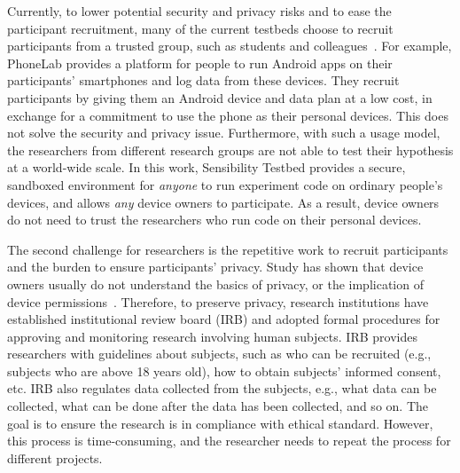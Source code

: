 Currently, to lower potential security and privacy risks and to ease the 
participant recruitment, many of the current testbeds choose to 
recruit participants from a trusted group, such as students and 
colleagues~\cite{hao2013isleep, wang2012no, 
wang2013sensing}. For example, PhoneLab provides a platform for 
people to run Android apps on their participants' smartphones 
and log data from these devices. They recruit participants by 
giving them an Android device and data plan at a low cost, in 
exchange for a commitment to use the phone as their personal 
devices. This does not solve the security and privacy issue. 
Furthermore, with such a usage model, the researchers from different research 
groups are not able to test their hypothesis at a world-wide scale.
In this work, Sensibility Testbed provides a secure, sandboxed 
environment for \textit{anyone} to run experiment code on ordinary 
people's devices, and allows \textit{any} device owners to participate. 
As a result, device owners do not need to trust the researchers 
who run code on their personal devices.

The second challenge for researchers is the repetitive work
to recruit participants and the burden to ensure participants' privacy. 
Study has shown that device owners usually do not understand the 
basics of privacy, or the implication of device 
permissions~\cite{camp2015respecting}. 
Therefore, to preserve privacy, research institutions have established 
institutional review board (IRB) \cite{irb} and adopted formal 
procedures for approving and monitoring research involving 
human subjects. IRB provides researchers with guidelines about 
subjects, such as who can be recruited (e.g., subjects
who are above 18 years old), 
how to obtain subjects' informed consent, etc. IRB also 
regulates data collected from the subjects, e.g., what data can be collected, what can 
be done after the data has been collected, and so on. The goal is
to ensure the research is in compliance with ethical standard. 
However, this process is time-consuming, and the researcher needs 
to repeat the process for different projects. 

